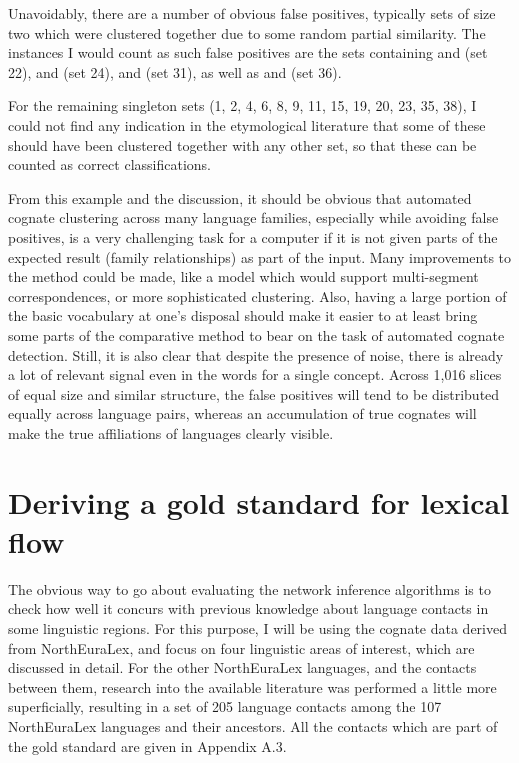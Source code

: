 Unavoidably, there are a number of obvious false positives, typically sets of size two which were clustered together due to some random partial similarity. The instances I would count as such false positives are the sets containing  and  (set 22),  and  (set 24),  and  (set 31), as well as  and  (set 36).

For the remaining singleton sets (1, 2, 4, 6, 8, 9, 11, 15, 19, 20, 23, 35, 38), I could not find any indication in the etymological literature that some of these should have been clustered together with any other set, so that these can be counted as correct classifications.

From this example and the discussion, it should be obvious that automated cognate clustering across many language families, especially while avoiding false positives, is a very challenging task for a computer if it is not given parts of the expected result (family relationships) as part of the input. Many improvements to the method could be made, like a model which would support multi-segment correspondences, or more sophisticated clustering. Also, having a large portion of the basic vocabulary at one's disposal should make it easier to at least bring some parts of the comparative method to bear on the task of automated cognate detection. Still, it is also clear that despite the presence of noise, there is already a lot of relevant signal even in the words for a single concept. Across 1,016 slices of equal size and similar structure, the false positives will tend to be distributed equally across language pairs, whereas an accumulation of true cognates will make the true affiliations of languages clearly
visible.

\section{Deriving a gold standard for lexical flow}\label{sec:4.6}
The obvious way to go about evaluating the network inference algorithms is to check how well it concurs with previous knowledge about language contacts in some linguistic regions. For this purpose, I will be using the cognate data derived from NorthEuraLex, and focus on four linguistic areas of interest, which are discussed in detail. For the other NorthEuraLex languages, and the contacts between them, research into the available literature was performed a little more superficially, resulting in a set of 205 language contacts among the 107 NorthEuraLex languages and their ancestors. All the contacts which are part of the gold standard are given in Appendix A.3.

